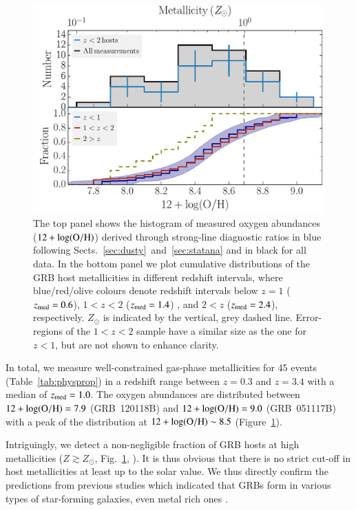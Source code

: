 \documentclass[traditabstract, longauth]{aa}
\newcommand{\oh}{12+\log(\rm{O/H})}
\begin{document}
\begin{figure}
\includegraphics[angle=0, width=0.99\columnwidth]{Figs/Z_histogram.pdf}
\caption{The top panel shows the histogram of measured oxygen abundances ($\oh$) derived through strong-line diagnostic ratios in blue following Sects.~\ref{sec:dusty}~and~\ref{sec:statana} and in black for all data. In the bottom panel we plot cumulative distributions of the GRB host metallicities in different redshift intervals, where blue/red/olive colours denote redshift intervals below $z=1$ ($z_{\rm{med}}=0.6$), $1<z<2$ ($z_{\rm{med}}=1.4$) , and $2<z$ ($z_{\rm{med}}=2.4$), respectively. $Z_{\odot}$ is indicated by the vertical, grey dashed line. Error-regions of the $1<z<2$ sample have a similar size as the one for $z<1$, but are not shown to enhance clarity.}
\label{fig:zhist}
\end{figure}

In total, we measure well-constrained gas-phase metallicities for 45 events (Table~\ref{tab:physprop}) in a redshift range between $z=0.3$ and $z=3.4$ with a median of $z_{\rm {med}}=1.0$. The oxygen abundances are distributed between $\oh=7.9$ (GRB~120118B) and $\oh=9.0$ (GRB~051117B) with a peak of the distribution at $\oh \sim 8.5$ (Figure~\ref{fig:zhist}). 

Intriguingly, we detect a non-negligible fraction of GRB hosts at high metallicities ($Z\gtrsim Z_{\odot}$, Fig.~\ref{fig:zhist}, \citealp[see also][]{2010ApJ...712L..26L, 2013A&A...556A..23E}). It is thus obvious that there is no strict cut-off in host metallicities at least up to the solar value. We thus directly confirm the predictions from previous studies which indicated that GRBs form in various types of star-forming galaxies, even metal rich ones \citep{2007ApJ...660..504B, 2011A&A...534A.108K, 2013ApJ...778..128P, 2015arXiv150402479P}.
\end{document}
